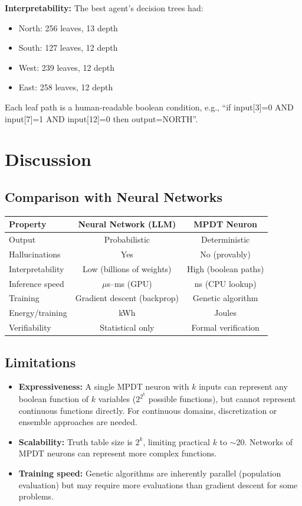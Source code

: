 \documentclass{article}
\begin{document}
\textbf{Interpretability:} The best agent's decision trees had:
\begin{itemize}
    \item North: 256 leaves, 13 depth
    \item South: 127 leaves, 12 depth
    \item West: 239 leaves, 12 depth
    \item East: 258 leaves, 12 depth
\end{itemize}

Each leaf path is a human-readable boolean condition, e.g., 
``if input[3]=0 AND input[7]=1 AND input[12]=0 then output=NORTH''.

\section{Discussion}

\subsection{Comparison with Neural Networks}

\begin{center}
\begin{tabular}{l|c|c}
\textbf{Property} & \textbf{Neural Network (LLM)} & \textbf{MPDT Neuron} \\
\hline
Output & Probabilistic & Deterministic \\
Hallucinations & Yes & No (provably) \\
Interpretability & Low (billions of weights) & High (boolean paths) \\
Inference speed & $\mu$s--ms (GPU) & ns (CPU lookup) \\
Training & Gradient descent (backprop) & Genetic algorithm \\
Energy/training & kWh & Joules \\
Verifiability & Statistical only & Formal verification \\
\end{tabular}
\end{center}

\subsection{Limitations}

\begin{itemize}
    \item \textbf{Expressiveness:} A single MPDT neuron with $k$ inputs can 
    represent any boolean function of $k$ variables ($2^{2^k}$ possible functions), 
    but cannot represent continuous functions directly. For continuous domains, 
    discretization or ensemble approaches are needed.
    \item \textbf{Scalability:} Truth table size is $2^k$, limiting practical 
    $k$ to $\sim$20. Networks of MPDT neurons can represent more complex functions.
    \item \textbf{Training speed:} Genetic algorithms are inherently parallel 
    (population evaluation) but may require more evaluations than gradient 
    descent for some problems.
\end{itemize}
\end{document}
